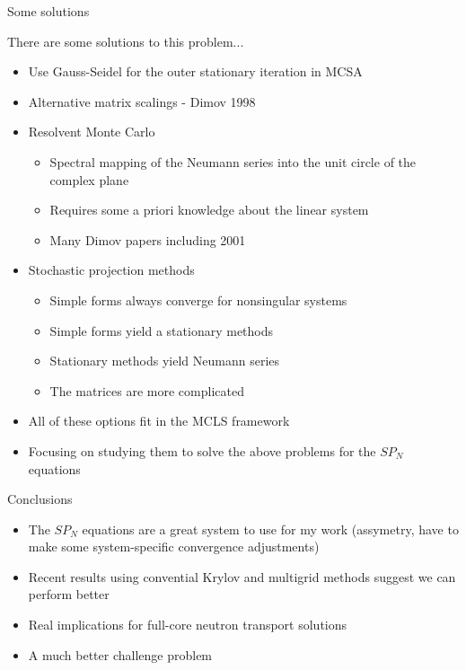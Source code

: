 \documentclass{beamer}
\begin{document}
\begin{frame}{Some solutions}

  There are some solutions to this problem...

  \begin{itemize}
  \item Use Gauss-Seidel for the outer stationary iteration in MCSA
  \item Alternative matrix scalings - Dimov 1998
  \item Resolvent Monte Carlo
    \begin{itemize}
    \item Spectral mapping of the Neumann series into the unit circle of
      the complex plane
    \item Requires some a priori knowledge about the linear system
    \item Many Dimov papers including 2001
      \end{itemize}
  \item Stochastic projection methods
    \begin{itemize}
      \item Simple forms always converge for nonsingular systems
      \item Simple forms yield a stationary methods
      \item Stationary methods yield Neumann series
      \item The matrices are more complicated
    \end{itemize}
  \item All of these options fit in the MCLS framework
  \item Focusing on studying them to solve the above problems for the
    $SP_N$ equations
  \end{itemize}

\end{frame}

\begin{frame}{Conclusions}

  \begin{itemize}
  \item The $SP_N$ equations are a great system to use for my work
    (assymetry, have to make some system-specific convergence
    adjustments)
  \item Recent results using convential Krylov and multigrid methods
    suggest we can perform better
  \item Real implications for full-core neutron transport solutions
  \item A much better challenge problem
  \end{itemize}

\end{frame}

\end{document}
